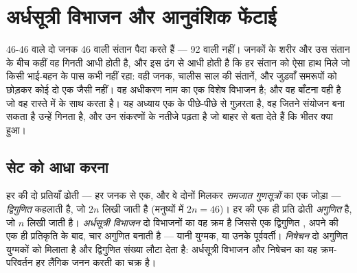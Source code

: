 \chapter{अर्धसूत्री विभाजन और आनुवंशिक फेंटाई}\label{ch:g12:meiosis-genetic-shuffling}

46-46  वाले दो जनक 46 वाली संतान पैदा करते हैं --- 92 वाली नहीं।
जनकों के शरीर और उस संतान के बीच कहीं वह गिनती आधी होती है, और इस ढंग से
आधी होती है कि हर संतान को ऐसा हाथ मिले जो किसी भाई-बहन के पास कभी नहीं
रहा: वही जनक, चालीस साल की संतानें, और जुड़वाँ समरूपों को छोड़कर कोई दो एक
जैसी नहीं। वह अधीकरण  नाम का एक विशेष विभाजन है; और वह
बाँटना वही है जो वह रास्ते में  के साथ करता है। यह अध्याय एक
 के पीछे-पीछे  से गुज़रता है, वह जितने संयोजन बना
सकता है उन्हें गिनता है, और उन संकरणों के नतीजे पढ़ता है जो बाहर से बता देते
हैं कि भीतर क्या हुआ।

\section{सेट को आधा करना}

\begin{definition}[द्विगुणित, अगुणित, अर्धसूत्री विभाजन]\label{def:g12:meiosis-genetic-shuffling:meiosis}
हर  की दो प्रतियाँ ढोती  --- हर जनक से एक, और वे दोनों मिलकर
\emph{समजात गुणसूत्रों} का एक जोड़ा --- \emph{द्विगुणित}
कहलाती है, जो $2n$ लिखी जाती है (मनुष्यों में $2n = 46$)। हर की एक ही
प्रति ढोती  \emph{अगुणित} है, जो $n$ लिखी जाती है।
\emph{अर्धसूत्री विभाजन} दो विभाजनों का वह क्रम है
जिससे एक द्विगुणित , अपने  की एक ही प्रतिकृति के बाद, चार अगुणित
 बनाती है --- यानी युग्मक, या उनके पूर्ववर्ती। \emph{निषेचन} दो
अगुणित युग्मकों को मिलाता है और द्विगुणित संख्या लौटा देता है: अर्धसूत्री
विभाजन और निषेचन का यह क्रम-परिवर्तन हर लैंगिक जनन करती  का चक्र है।
\end{definition}

